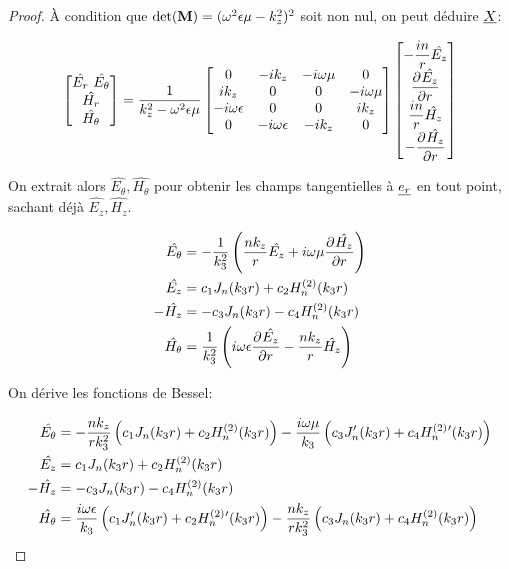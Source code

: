 \begin{proof}
        À condition que \(\det(\mat{M}) = (\w^2\eps\mu-k_z^2)^2\) soit non nul, on peut déduire \(\v{X}\):

        \begin{equation}
            \begin{bmatrix}
                \hat{E_r}\
                \hat{E_\theta}\\
                \hat{H_r}\\
                \hat{H_\theta}
            \end{bmatrix} =
            \frac{1}{k_z^2 - \w^2\eps\mu}
            \begin{bmatrix}
            0 & -ik_z & -i\w\mu & 0 
            \\
            ik_z & 0 & 0 & -i\w\mu
            \\
            -i\w\eps & 0 & 0 & ik_z
            \\
            0 & -i\w\eps & -ik_z & 0
            \end{bmatrix}
            \begin{bmatrix}
                -\frac{in}{r}\hat{E_z}\\
                \ddr{r}{\hat{E_z}}\\
                \frac{in}{r}\hat{H_z}\\
                -\ddr{r}{\hat{H_z}}
            \end{bmatrix}
        \end{equation}

        On extrait alors \(\hat{E_\theta}, \hat{H_\theta}\) pour obtenir les champs tangentielles à \(\v{e_r}\) en tout point, sachant déjà \(\hat{E_z}, \hat{H_z}\).

        \begin{align}
            \hat{E_\theta} &= -\frac{1}{k_3^2}\left(\frac{nk_z}{r}\hat{E_z} + i\w\mu\ddr{r}{\hat{H_z}}\right)
            \\
            \hat{E_z} &= c_1 J_n(k_3 r) + c_2 H_n^{(2)}(k_3 r)
            \\
            -\hat{H_z} &= -c_3 J_n(k_3 r) - c_4 H_n^{(2)}(k_3 r)
            \\
            \hat{H_\theta} &= \frac{1}{k_3^2}\left(i\w\eps\ddr{r}{\hat{E_z}} - \frac{nk_z}{r}\hat{H_z}\right)
        \end{align}

        On dérive les fonctions de Bessel:

       \begin{align}
            \hat{E_\theta} &= -\frac{nk_z}{rk_3^2}\left(c_1J_n(k_3r) + c_2 H_n^{(2)}(k_3r)\right) - \frac{i\w\mu}{k_3}\left(c_3J_n'(k_3r) + c_4 H_n^{(2)}{}'(k_3r)\right)
            \\
            \hat{E_z} &= c_1 J_n(k_3 r) + c_2 H_n^{(2)}(k_3 r)
            \\
            -\hat{H_z} &= -c_3 J_n(k_3 r) - c_4 H_n^{(2)}(k_3 r)
            \\
            \hat{H_\theta} &= \frac{i\w\eps}{k_3}\left(c_1J_n'(k_3r) + c_2 H_n^{(2)}{}'(k_3r)\right) - \frac{nk_z}{rk_3^2}\left(c_3J_n(k_3r) + c_4 H_n^{(2)}(k_3r)\right)
        \end{align}


\end{proof}
